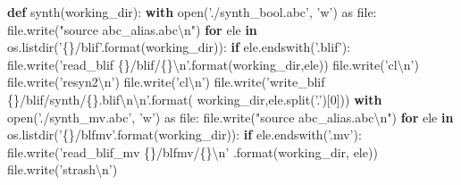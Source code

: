 \documentclass[]{book}
\newenvironment{Shaded}{\begin{snugshade}}{\end{snugshade}}
\newcommand{\BuiltInTok}[1]{#1}
\newcommand{\CharTok}[1]{\textcolor[rgb]{0.31,0.60,0.02}{#1}}
\newcommand{\ControlFlowTok}[1]{\textcolor[rgb]{0.13,0.29,0.53}{\textbf{#1}}}
\newcommand{\DecValTok}[1]{\textcolor[rgb]{0.00,0.00,0.81}{#1}}
\newcommand{\ImportTok}[1]{#1}
\newcommand{\KeywordTok}[1]{\textcolor[rgb]{0.13,0.29,0.53}{\textbf{#1}}}
\newcommand{\NormalTok}[1]{#1}
\newcommand{\SpecialCharTok}[1]{\textcolor[rgb]{0.00,0.00,0.00}{#1}}
\newcommand{\StringTok}[1]{\textcolor[rgb]{0.31,0.60,0.02}{#1}}
\begin{document}
\begin{Shaded}
\begin{Highlighting}[]
\KeywordTok{def}\NormalTok{ synth(working_dir):  }
  \ControlFlowTok{with} \BuiltInTok{open}\NormalTok{(}\StringTok{'./synth_bool.abc'}\NormalTok{, }\StringTok{'w'}\NormalTok{) }\ImportTok{as} \BuiltInTok{file}\NormalTok{:}
    \BuiltInTok{file}\NormalTok{.write(}\StringTok{"source abc_alias.abc}\CharTok{\textbackslash{}n}\StringTok{"}\NormalTok{)}
    \ControlFlowTok{for}\NormalTok{ ele }\KeywordTok{in}\NormalTok{ os.listdir(}\StringTok{'}\SpecialCharTok{\{\}}\StringTok{/blif'}\NormalTok{.}\BuiltInTok{format}\NormalTok{(working_dir)):}
      \ControlFlowTok{if}\NormalTok{ ele.endswith(}\StringTok{'.blif'}\NormalTok{):}
        \BuiltInTok{file}\NormalTok{.write(}\StringTok{'read_blif }\SpecialCharTok{\{\}}\StringTok{/blif/}\SpecialCharTok{\{\}}\CharTok{\textbackslash{}n}\StringTok{'}\NormalTok{.}\BuiltInTok{format}\NormalTok{(working_dir,ele))}
        \BuiltInTok{file}\NormalTok{.write(}\StringTok{'cl}\CharTok{\textbackslash{}n}\StringTok{'}\NormalTok{)}
        \BuiltInTok{file}\NormalTok{.write(}\StringTok{'resyn2}\CharTok{\textbackslash{}n}\StringTok{'}\NormalTok{)}
        \BuiltInTok{file}\NormalTok{.write(}\StringTok{'cl}\CharTok{\textbackslash{}n}\StringTok{'}\NormalTok{)}
        \BuiltInTok{file}\NormalTok{.write(}\StringTok{'write_blif }\SpecialCharTok{\{\}}\StringTok{/blif/synth/}\SpecialCharTok{\{\}}\StringTok{.blif}\CharTok{\textbackslash{}n\textbackslash{}n}\StringTok{'}\NormalTok{.}\BuiltInTok{format}\NormalTok{(}
\NormalTok{          working_dir,ele.split(}\StringTok{'.'}\NormalTok{)[}\DecValTok{0}\NormalTok{]))}
  \ControlFlowTok{with} \BuiltInTok{open}\NormalTok{(}\StringTok{'./synth_mv.abc'}\NormalTok{, }\StringTok{'w'}\NormalTok{) }\ImportTok{as} \BuiltInTok{file}\NormalTok{:}
    \BuiltInTok{file}\NormalTok{.write(}\StringTok{"source abc_alias.abc}\CharTok{\textbackslash{}n}\StringTok{"}\NormalTok{)}
    \ControlFlowTok{for}\NormalTok{ ele }\KeywordTok{in}\NormalTok{ os.listdir(}\StringTok{'}\SpecialCharTok{\{\}}\StringTok{/blfmv'}\NormalTok{.}\BuiltInTok{format}\NormalTok{(working_dir)):}
      \ControlFlowTok{if}\NormalTok{ ele.endswith(}\StringTok{'.mv'}\NormalTok{):}
        \BuiltInTok{file}\NormalTok{.write(}\StringTok{'read_blif_mv }\SpecialCharTok{\{\}}\StringTok{/blfmv/}\SpecialCharTok{\{\}}\CharTok{\textbackslash{}n}\StringTok{'}
\NormalTok{          .}\BuiltInTok{format}\NormalTok{(working_dir, ele))}
        \BuiltInTok{file}\NormalTok{.write(}\StringTok{'strash}\CharTok{\textbackslash{}n}\StringTok{'}\NormalTok{)}

\end{Highlighting}
\end{Shaded}
\end{document}
